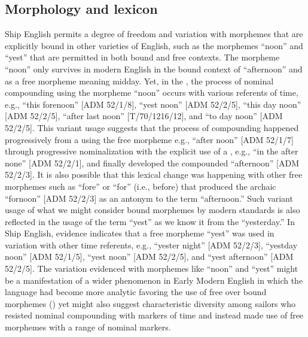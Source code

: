 \subsection{{Morphology and lexicon}}%

Ship English permits a degree of freedom and variation with morphemes that are explicitly bound in other varieties of English, such as the morphemes “noon” and “yest” that are permitted in both bound and free contexts. The morpheme “noon” only survives in modern English in the bound context of “afternoon” and as a free morpheme meaning midday. Yet, in the , the process of nominal compounding using the morpheme “noon” occurs with various referents of time, e.g., “this forenoon” [ADM 52/1/8], “yest noon” [ADM 52/2/5], “this day noon” [ADM 52/2/5], “after last noon” [T/70/1216/12], and “to day noon” [ADM 52/2/5]. This variant usage suggests that the process of compounding happened progressively from a  using the free morpheme e.g., “after noon” [ADM 52/1/7] through progressive nominalization with the explicit use of a , e.g., “in the after none” [ADM 52/2/1], and finally developed the compounded  “afternoon” [ADM 52/2/3]. It is also possible that this lexical change was happening with other free morphemes such as “fore” or “for” (i.e., before) that produced the archaic  “fornoon” [ADM 52/2/3] as an antonym to the term “afternoon.” Such variant usage of what we might consider bound morphemes by modern standards is also reflected in the usage of the term “yest” as we know it from the  “yesterday.”  In Ship English, evidence indicates that a free morpheme “yest” was used in variation with other time referents, e.g., “yester night” [ADM 52/2/3], “yestday noon” [ADM 52/1/5], “yest noon” [ADM 52/2/5], and “yest afternoon” [ADM 52/2/5]. The variation evidenced with morphemes like “noon” and “yest” might be a manifestation of a wider phenomenon in Early Modern English in which the language had become more analytic favoring the use of free over bound morphemes (\citealt{MillwardHayes2012}) yet might also suggest characteristic diversity among sailors who resisted nominal compounding with markers of time and instead made use of free morphemes with a range of nominal markers.  

